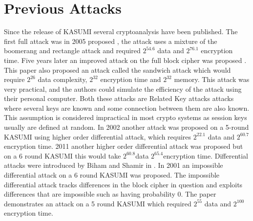 \section{Previous Attacks}
Since the release of KASUMI several cryptoanalysis have been published.
The first full attack was in 2005 proposed \cite{rect}, the attack uses a mixture of the boomerang and rectangle attack\cite{rectangle}\cite{boom} and required $2^{54.6}$ data and $2^{76.1}$ encryption time.
Five years later an improved attack on the full block cipher was proposed \cite{sand}. This paper also proposed an attack called the sandwich attack which would require $2^{26}$ data complexity, $2^{32}$ encryption time and $2^{32}$ memory. This attack was very practical, and the authors could simulate the efficiency of the attack using their personal computer. Both these attacks are Related Key attacks\cite{relate} attacks where several keys are known and some connection between them are also known. This assumption is considered impractical in most crypto systems as session keys usually are defined at random. In 2002 another attack was proposed on a 5-round KASUMI\cite{single2002} using higher order differential attack, which requires  $2^{22.1}$ data and $2^{60.7}$ encryption time. 2011 another higher order differential attack was proposed but on a 6 round KASUMI\cite{single} this would take $2^{60.8}$data $2^{65.4}$encryption time. Differential attacks were introduced by Biham and Shamir in \cite{diff}. In 2001 an impossible differential attack on a 6 round KASUMI was proposed\cite{imp}. The impossible differential attack tracks differences in the block cipher in question and exploits differences that are impossible such as having probability 0. The paper demonstrates an attack on a 5 round KASUMI which required $2^{55}$ data and $2^{100}$ encryption time.


